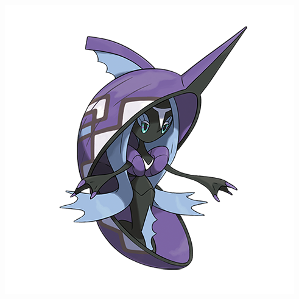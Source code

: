\documentclass[landscape]{article}
\begin{document}
\begin{multicols}{3}
\clearpage
{}
\vspace{-0.3cm}
\noindent\begin{minipage}{0.3\linewidth}
\includegraphics[width=\linewidth]{images/pokedex.png}
\end{minipage}
\begin{minipage}{0.71\linewidth}

\end{minipage}

\setnormallinewidth{0.3pt}
\setthicklinewidth{1pt}
\begin{center}
\begin{starbattle}
\framepuzzle
{}

\end{starbattle}
\end{center}


\end{multicols}
\end{document}
